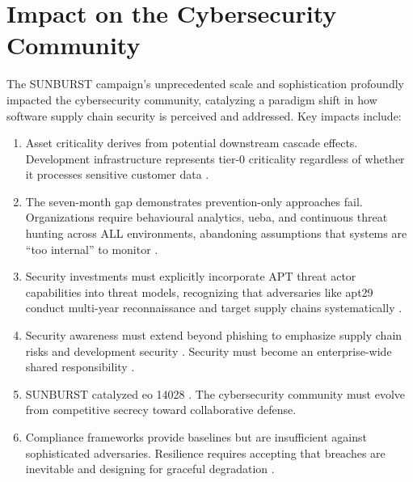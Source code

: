 \section{Impact on the Cybersecurity Community}
\label{sec:community_impact}

The SUNBURST campaign's unprecedented scale and sophistication profoundly impacted the cybersecurity community, catalyzing a paradigm shift in how software supply chain security is perceived and addressed. Key impacts include:

\begin{enumerate}
    \item {} Asset criticality derives from potential downstream cascade effects. Development infrastructure represents tier-0 criticality regardless of whether it processes sensitive customer data \cite{boyens_cybersecurity_2024}.
    \item {} The seven-month gap demonstrates prevention-only approaches fail. Organizations require behavioural analytics, \gls{ueba}, and continuous threat hunting across ALL environments, abandoning assumptions that systems are ``too internal'' to monitor \cite{nelson_incident_2025}.
    \item {} Security investments must explicitly incorporate APT threat actor capabilities into threat models, recognizing that adversaries like \gls{apt}29 conduct multi-year reconnaissance and target supply chains systematically \cite{mitre_apt29_2025}.
    \item {} Security awareness must extend beyond phishing to emphasize supply chain risks and development security \cite{boyens_cybersecurity_2024}. Security must become an enterprise-wide shared responsibility \cite{pascoe_nist_2024}.
    \item {} SUNBURST catalyzed \gls{eo} 14028 \cite{biden2021}. The cybersecurity community must evolve from competitive secrecy toward collaborative defense.
    \item {} Compliance frameworks provide baselines but are insufficient against sophisticated adversaries. Resilience requires accepting that breaches are inevitable and designing for graceful degradation \cite{nelson_incident_2025}.
\end{enumerate}
